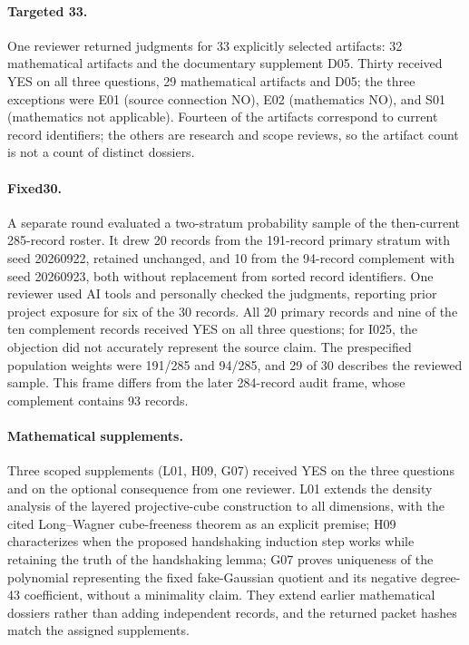 \paragraph{Targeted 33.}
One reviewer returned judgments for 33 explicitly selected artifacts: 32 mathematical artifacts and the documentary supplement D05. Thirty received YES on all three questions, 29 mathematical artifacts and D05; the three exceptions were E01 (source connection NO), E02 (mathematics NO), and S01 (mathematics not applicable). Fourteen of the artifacts correspond to current record identifiers; the others are research and scope reviews, so the artifact count is not a count of distinct dossiers.

\paragraph{Fixed30.}
A separate round evaluated a two-stratum probability sample of the then-current 285-record roster. It drew 20 records from the 191-record primary stratum with seed 20260922, retained unchanged, and 10 from the 94-record complement with seed 20260923, both without replacement from sorted record identifiers. One reviewer used AI tools and personally checked the judgments, reporting prior project exposure for six of the 30 records. All 20 primary records and nine of the ten complement records received YES on all three questions; for I025, the objection did not accurately represent the source claim. The prespecified population weights were 191/285 and 94/285, and 29 of 30 describes the reviewed sample. This frame differs from the later 284-record audit frame, whose complement contains 93 records.

\paragraph{Mathematical supplements.}
Three scoped supplements (L01, H09, G07) received YES on the three questions and on the optional consequence from one reviewer. L01 extends the density analysis of the layered projective-cube construction to all dimensions, with the cited Long--Wagner cube-freeness theorem as an explicit premise; H09 characterizes when the proposed handshaking induction step works while retaining the truth of the handshaking lemma; G07 proves uniqueness of the polynomial representing the fixed fake-Gaussian quotient and its negative degree-43 coefficient, without a minimality claim. They extend earlier mathematical dossiers rather than adding independent records, and the returned packet hashes match the assigned supplements.

